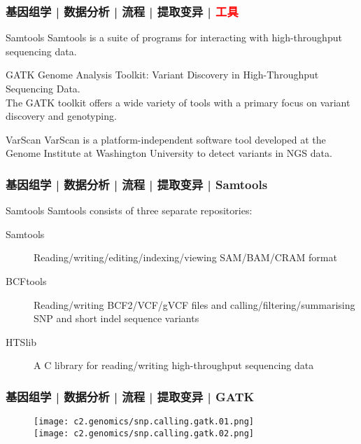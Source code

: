 \begin{frame}
  \frametitle{基因组学 | 数据分析 | 流程 | 提取变异 | \textcolor{red}{工具}}
  \begin{block}{Samtools}
    Samtools is a suite of programs for interacting with high-throughput sequencing data.
  \end{block}
  \pause
  \begin{block}{GATK}
    Genome Analysis Toolkit: Variant Discovery in High-Throughput Sequencing Data.\\
    The GATK toolkit offers a wide variety of tools with a primary focus on variant discovery and genotyping.
  \end{block}
  \pause
  \begin{block}{VarScan}
    VarScan is a platform-independent software tool developed at the Genome Institute at Washington University to detect variants in NGS data.
  \end{block}
\end{frame}

\begin{frame}
  \frametitle{基因组学 | 数据分析 | 流程 | 提取变异 | Samtools}
  \begin{block}{Samtools}
    Samtools consists of three separate repositories:
    \begin{description}
      \item[Samtools] Reading/writing/editing/indexing/viewing SAM/BAM/CRAM format
      \item[BCFtools] Reading/writing BCF2/VCF/gVCF files and calling/filtering/summarising SNP and short indel sequence variants
      \item[HTSlib] A C library for reading/writing high-throughput sequencing data 
    \end{description}
  \end{block}
\end{frame}

\begin{frame}
  \frametitle{基因组学 | 数据分析 | 流程 | 提取变异 | GATK}
  \begin{figure}
    \centering
    \texttt{[image: c2.genomics/snp.calling.gatk.01.png]}\\
    \vspace{1em}
    \texttt{[image: c2.genomics/snp.calling.gatk.02.png]}
  \end{figure}
\end{frame}

